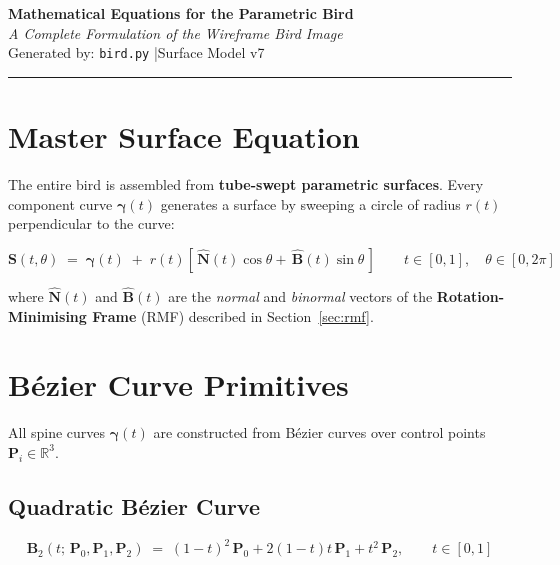 \documentclass[12pt,a4paper]{article}
\newcommand{\vv}[1]{\bm{#1}}          %
\newcommand{\R}{\mathbb{R}}
\begin{document}
\begin{center}
  {\LARGE \textbf{Mathematical Equations for the Parametric Bird}}\\[6pt]
  {\large \textit{A Complete Formulation of the Wireframe Bird Image}}\\[4pt]
  {\small Generated by: \texttt{bird.py} \quad|\quad Surface Model v7}
\end{center}

\vspace{0.5em}
\hrule
\vspace{1em}

\section{Master Surface Equation}

The entire bird is assembled from \textbf{tube-swept parametric surfaces}.
Every component curve $\vv{\gamma}(t)$ generates a surface by sweeping a
circle of radius $r(t)$ perpendicular to the curve:

\begin{equation}
  \boxed{
    \vv{S}(t,\theta)
    \;=\;
    \vv{\gamma}(t)
    \;+\;
    r(t)\!\left[\,\hat{\vv{N}}(t)\cos\theta
                  +\, \hat{\vv{B}}(t)\sin\theta\,\right]
  }
  \qquad t\in[0,1],\quad \theta\in[0,2\pi]
\end{equation}

where $\hat{\vv{N}}(t)$ and $\hat{\vv{B}}(t)$ are the \emph{normal} and
\emph{binormal} vectors of the \textbf{Rotation-Minimising Frame} (RMF)
described in Section~\ref{sec:rmf}.

\section{Bézier Curve Primitives}

All spine curves $\vv{\gamma}(t)$ are constructed from Bézier curves over
control points $\vv{P}_i \in \R^3$.

\subsection{Quadratic Bézier Curve}
\begin{equation}
  \vv{B}_2(t;\,\vv{P}_0,\vv{P}_1,\vv{P}_2)
  \;=\;
  (1-t)^2\,\vv{P}_0
  + 2(1-t)t\,\vv{P}_1
  + t^2\,\vv{P}_2,
  \qquad t\in[0,1]
\end{equation}
\end{document}
